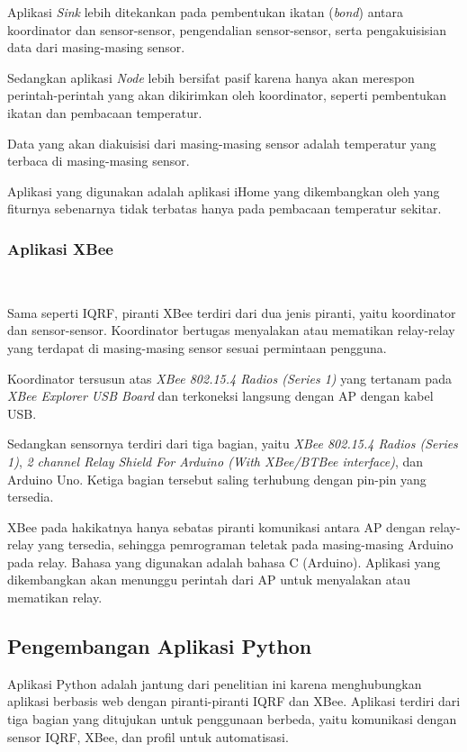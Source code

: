 				Aplikasi \emph{Sink} lebih ditekankan pada pembentukan ikatan (\emph{bond}) antara koordinator dan sensor-sensor, pengendalian sensor-sensor, serta pengakuisisian data dari masing-masing sensor.

				Sedangkan aplikasi \emph{Node} lebih bersifat pasif karena hanya akan merespon perintah-perintah yang akan dikirimkan oleh koordinator, seperti pembentukan ikatan dan pembacaan temperatur.

				Data yang akan diakuisisi dari masing-masing sensor adalah temperatur yang terbaca di masing-masing sensor.

				Aplikasi yang digunakan adalah aplikasi iHome yang dikembangkan oleh \cite{widyawan2012ihome} yang fiturnya sebenarnya tidak terbatas hanya pada pembacaan temperatur sekitar.

			\subsubsection{Aplikasi XBee}\

				Sama seperti IQRF, piranti XBee terdiri dari dua jenis piranti, yaitu koordinator dan sensor-sensor. Koordinator bertugas menyalakan atau mematikan relay-relay yang terdapat di masing-masing sensor sesuai permintaan pengguna.

				Koordinator tersusun atas \emph{XBee 802.15.4 Radios (Series 1)} yang tertanam pada \emph{XBee Explorer USB Board} dan terkoneksi langsung dengan AP dengan kabel USB.

				Sedangkan sensornya terdiri dari tiga bagian, yaitu \emph{XBee 802.15.4 Radios (Series 1)}, \emph{2 channel Relay Shield For Arduino (With XBee/BTBee interface)}, dan Arduino Uno. Ketiga bagian tersebut saling terhubung dengan pin-pin yang tersedia.

				XBee pada hakikatnya hanya sebatas piranti komunikasi antara AP dengan relay-relay yang tersedia, sehingga pemrograman teletak pada masing-masing Arduino pada relay. Bahasa yang digunakan adalah bahasa C (Arduino). Aplikasi yang dikembangkan akan menunggu perintah dari AP untuk menyalakan atau mematikan relay.

		\subsection{Pengembangan Aplikasi Python}
			Aplikasi Python adalah jantung dari penelitian ini karena menghubungkan aplikasi berbasis web dengan piranti-piranti IQRF dan XBee.	Aplikasi terdiri dari tiga bagian yang ditujukan untuk penggunaan berbeda, yaitu komunikasi dengan sensor IQRF, XBee, dan profil untuk automatisasi.

